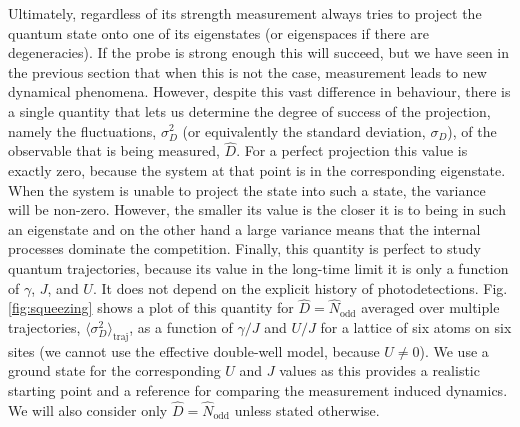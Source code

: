 Ultimately, regardless of its strength measurement always tries to
project the quantum state onto one of its eigenstates (or eigenspaces
if there are degeneracies). If the probe is strong enough this will
succeed, but we have seen in the previous section that when this is
not the case, measurement leads to new dynamical phenomena. However,
despite this vast difference in behaviour, there is a single quantity
that lets us determine the degree of success of the projection, namely
the fluctuations, $\sigma_D^2$ (or equivalently the standard
deviation, $\sigma_D$), of the observable that is being measured,
$\hat{D}$. For a perfect projection this value is exactly zero,
because the system at that point is in the corresponding
eigenstate. When the system is unable to project the state into such a
state, the variance will be non-zero. However, the smaller its value
is the closer it is to being in such an eigenstate and on the other
hand a large variance means that the internal processes dominate the
competition. Finally, this quantity is perfect to study quantum
trajectories, because its value in the long-time limit it is only a
function of $\gamma$, $J$, and $U$. It does not depend on the explicit
history of photodetections. Fig. \ref{fig:squeezing} shows a plot of
this quantity for $\hat{D} = \hat{N}_\mathrm{odd}$ averaged over
multiple trajectories, $\langle \sigma^2_D \rangle_\mathrm{traj}$, as
a function of $\gamma/J$ and $U/J$ for a lattice of six atoms on six
sites (we cannot use the effective double-well model, because
$U \ne 0$). We use a ground state for the corresponding $U$ and $J$
values as this provides a realistic starting point and a reference for
comparing the measurement induced dynamics. We will also consider only
$\hat{D} = \hat{N}_\mathrm{odd}$ unless stated otherwise.

